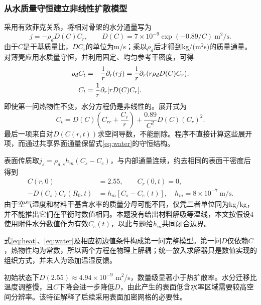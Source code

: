 \subsubsection{从水质量守恒建立非线性扩散模型}
采用有效菲克关系，将相对骨架的水分通量写为
\begin{equation}
j=-\rho_dD(C)C_r,\qquad
D(C)=7\times10^{-9}\exp(-0.89/C)\ \mathrm{m^2/s}.
\label{eq:fick}
\end{equation}
由于$C$是干基质量比，$D C_r$的单位为m/s；乘以$\rho_d$后才得到kg/(m$^2$s)的质量通量。对薄壳应用水质量守恒，并利用固定、均匀参考干密度，可得
\begin{align}
\rho_d C_t&=-\frac1r\partial_r(rj)
=\frac1r\partial_r(r\rho_dD(C)C_r),\\
C_t&=\frac1r\partial_r[rD(C)C_r].
\label{eq:water}
\end{align}
即使第一问热物性不变，水分方程仍是非线性的。展开式为
\begin{equation}
C_t=D(C)\left(C_{rr}+\frac{C_r}{r}\right)
+\frac{0.89}{C^2}D(C)(C_r)^2 .
\label{eq:nonlinearwater}
\end{equation}
最后一项来自对$D(C(r,t))$求空间导数，不能删除。程序不直接计算这些展开项，而通过共享界面通量保留式\eqref{eq:water}的守恒结构。

表面传质取$j_s=\rho_{d,s}h_m(C_s-C_e)$，与内部通量连续，约去相同的表面干密度后得到
\begin{align}
C(r,0)&=2.55,\qquad C_r(0,t)=0,\\
-D(C_s)C_r(R_0,t)&=h_m[C_s-C_e(t)],
\quad h_m=8\times10^{-7}\ \mathrm{m/s}.
\label{eq:waterbc}
\end{align}
由于空气湿度和材料干基含水率的质量分母可能不同，仅凭二者单位同为kg/kg，并不能推出它们在平衡时数值相同。本题没有给出材料解吸等温线，本文按假设4使用附件水分数值作为有效$C_e(t)$，以此与题给$h_m$共同闭合边界。

式\eqref{eq:heat}、\eqref{eq:water}及相应初边值条件构成第一问完整模型。第一问$D$仅依赖$C$，热物性均为常数，所以两个方程在物理上解耦；统一放入求解器只是数值实现的组织方式，并未人为添加温湿反馈。

初始状态下$D(2.55)\approx4.94\times10^{-9}$ m$^2$/s，数量级显著小于热扩散率。水分迁移比温度调整慢，且$C$下降会进一步降低$D$，由此产生的表面低含水率区域需要较高空间分辨率。该特征解释了后续采用表面加密网格的必要性。

\nextpage

